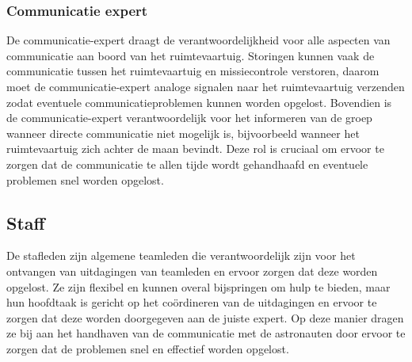 \documentclass[
	a4paper, %
	10pt, %
	unnumberedsections, %
	twoside, %
]{LTJournalArticle}
\begin{document}
\subsubsection{Communicatie expert}
De communicatie-expert draagt de verantwoordelijkheid voor alle aspecten van communicatie aan boord van het ruimtevaartuig. Storingen kunnen vaak de communicatie tussen het ruimtevaartuig en missiecontrole verstoren, daarom moet de communicatie-expert analoge signalen naar het ruimtevaartuig verzenden zodat eventuele communicatieproblemen kunnen worden opgelost. Bovendien is de communicatie-expert verantwoordelijk voor het informeren van de groep wanneer directe communicatie niet mogelijk is, bijvoorbeeld wanneer het ruimtevaartuig zich achter de maan bevindt. Deze rol is cruciaal om ervoor te zorgen dat de communicatie te allen tijde wordt gehandhaafd en eventuele problemen snel worden opgelost.

\subsection{Staff}
De stafleden zijn algemene teamleden die verantwoordelijk zijn voor het ontvangen van uitdagingen van teamleden en ervoor zorgen dat deze worden opgelost. Ze zijn flexibel en kunnen overal bijspringen om hulp te bieden, maar hun hoofdtaak is gericht op het coördineren van de uitdagingen en ervoor te zorgen dat deze worden doorgegeven aan de juiste expert. Op deze manier dragen ze bij aan het handhaven van de communicatie met de astronauten door ervoor te zorgen dat de problemen snel en effectief worden opgelost.

\newpage
\appendix







\printbibliography %

\end{document}
